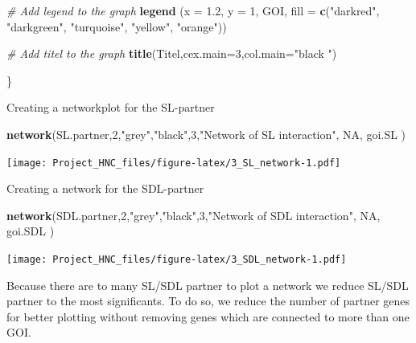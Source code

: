 \documentclass[]{article}
\newenvironment{Shaded}{\begin{snugshade}}{\end{snugshade}}
\newcommand{\KeywordTok}[1]{\textcolor[rgb]{0.13,0.29,0.53}{\textbf{#1}}}
\newcommand{\DataTypeTok}[1]{\textcolor[rgb]{0.13,0.29,0.53}{#1}}
\newcommand{\DecValTok}[1]{\textcolor[rgb]{0.00,0.00,0.81}{#1}}
\newcommand{\FloatTok}[1]{\textcolor[rgb]{0.00,0.00,0.81}{#1}}
\newcommand{\StringTok}[1]{\textcolor[rgb]{0.31,0.60,0.02}{#1}}
\newcommand{\CommentTok}[1]{\textcolor[rgb]{0.56,0.35,0.01}{\textit{#1}}}
\newcommand{\OtherTok}[1]{\textcolor[rgb]{0.56,0.35,0.01}{#1}}
\newcommand{\NormalTok}[1]{#1}
\begin{document}
\begin{Shaded}
\begin{Highlighting}[]
  \CommentTok{# Add legend to the graph}
  \KeywordTok{legend}\NormalTok{ (}\DataTypeTok{x =} \FloatTok{1.2}\NormalTok{,}
          \DataTypeTok{y =} \DecValTok{1}\NormalTok{, GOI,}
          \DataTypeTok{fill =} \KeywordTok{c}\NormalTok{(}\StringTok{"darkred"}\NormalTok{, }\StringTok{"darkgreen"}\NormalTok{, }\StringTok{"turquoise"}\NormalTok{, }\StringTok{"yellow"}\NormalTok{, }\StringTok{"orange"}\NormalTok{))}

  \CommentTok{# Add titel to the graph}
  \KeywordTok{title}\NormalTok{(Titel,}\DataTypeTok{cex.main=}\DecValTok{3}\NormalTok{,}\DataTypeTok{col.main=}\StringTok{"black "}\NormalTok{)}

\NormalTok{\}}
\end{Highlighting}
\end{Shaded}

Creating a networkplot for the SL-partner

\begin{Shaded}
\begin{Highlighting}[]
\KeywordTok{network}\NormalTok{(SL.partner,}\DecValTok{2}\NormalTok{,}\StringTok{"grey"}\NormalTok{,}\StringTok{"black"}\NormalTok{,}\DecValTok{3}\NormalTok{,}\StringTok{"Network of SL interaction"}\NormalTok{, }\OtherTok{NA}\NormalTok{, goi.SL )}
\end{Highlighting}
\end{Shaded}

\texttt{[image: Project\_HNC\_files/figure-latex/3\_SL\_network-1.pdf]}

Creating a network for the SDL-partner

\begin{Shaded}
\begin{Highlighting}[]
\KeywordTok{network}\NormalTok{(SDL.partner,}\DecValTok{2}\NormalTok{,}\StringTok{"grey"}\NormalTok{,}\StringTok{"black"}\NormalTok{,}\DecValTok{3}\NormalTok{,}\StringTok{"Network of SDL interaction"}\NormalTok{, }\OtherTok{NA}\NormalTok{, goi.SDL )}
\end{Highlighting}
\end{Shaded}

\texttt{[image: Project\_HNC\_files/figure-latex/3\_SDL\_network-1.pdf]}

Because there are to many SL/SDL partner to plot a network we reduce
SL/SDL partner to the most significants. To do so, we reduce the number
of partner genes for better plotting without removing genes which are
connected to more than one GOI.
\end{document}
